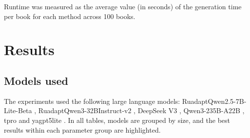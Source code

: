 \documentclass{superfri}
\begin{document}
Runtime was measured as the average value (in seconds) of the generation time per book for each method across 100 books.


\section{Results}

\subsection{Models used}
The experiments used the following large language models:
RuadaptQwen2.5-7B-Lite-Beta \cite{ruadapt},
RuadaptQwen3-32BInstruct-v2 \cite{ruadapt},
DeepSeek V3 \cite{deepseek},
Qwen3-235B-A22B \cite{qwen3},
tpro \cite{tpro} and yagpt5lite \cite{yagpt}.
In all tables, models are grouped by size, and the best results within each parameter group are highlighted.
\end{document}
